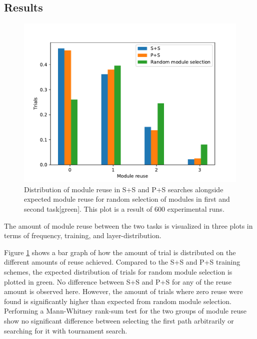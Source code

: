 \subsection{Results}
\label{exp1:BIN.results}
\begin{figure}[t]
    \includegraphics[width=\textwidth]{Chapters/4.Experiments/exp1/figures/BIN_module_reuse_bargraph.pdf}
    \caption[Module reuse for binary MNIST classification]{Distribution of module reuse in S+S and P+S searches alongside expected module reuse for random selection of modules in first and second task[green]. This plot is a result of 600 experimental runs.}
    \label{fig:binMNIST.hist}
\end{figure}

The amount of module reuse between the two tasks is visualized in three plots in terms of frequency, training, and layer-distribution.

Figure \ref{fig:binMNIST.hist} shows a bar graph of how the amount of trial is distributed on the different amounts of reuse achieved. Compared to the S+S and P+S training schemes, the expected distribution of trials for random module selection is plotted in green. No difference between S+S and P+S for any of the reuse amount is observed here. However, the amount of trials where zero reuse were found is significantly higher than expected from random module selection. Performing a Mann-Whitney rank-sum test for the two groups of module reuse show no significant difference between selecting the first path arbitrarily or searching for it with tournament search. 

